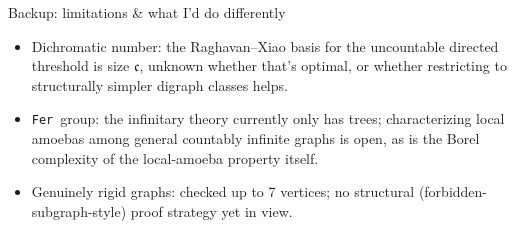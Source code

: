 \documentclass[aspectratio=169]{beamer}
\newcommand{\tFer}{\texttt{Fer}\ }
\begin{document}
\begin{frame}{Backup: limitations \& what I'd do differently}
  \begin{itemize}
    \item Dichromatic number: the Raghavan--Xiao basis for the uncountable directed threshold is size $\mathfrak c$, unknown whether that's optimal, or whether restricting to structurally simpler digraph classes helps.
    \item \tFer group: the infinitary theory currently only has trees; characterizing local amoebas among general countably infinite graphs is open, as is the Borel complexity of the local-amoeba property itself.
    \item Genuinely rigid graphs: checked up to 7 vertices; no structural (forbidden-subgraph-style) proof strategy yet in view.
  \end{itemize}
\end{frame}
\fi
\end{document}
